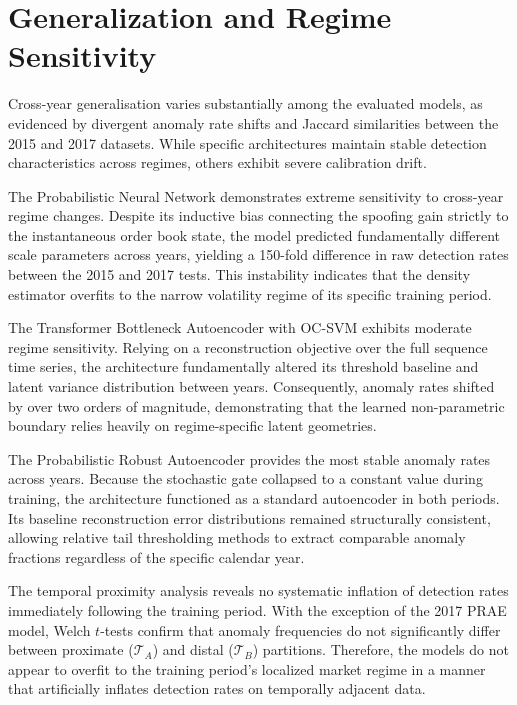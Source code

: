 \documentclass[11pt]{report}
\begin{document}
\section{Generalization and Regime Sensitivity}\label{sec:discussion:generalization}

Cross-year generalisation varies substantially among the evaluated models, as evidenced by divergent anomaly rate shifts and Jaccard similarities between the 2015 and 2017 datasets. While specific architectures maintain stable detection characteristics across regimes, others exhibit severe calibration drift.

The Probabilistic Neural Network demonstrates extreme sensitivity to cross-year regime changes. Despite its inductive bias connecting the spoofing gain strictly to the instantaneous order book state, the model predicted fundamentally different scale parameters across years, yielding a 150-fold difference in raw detection rates between the 2015 and 2017 tests. This instability indicates that the density estimator overfits to the narrow volatility regime of its specific training period.

The Transformer Bottleneck Autoencoder with OC-SVM exhibits moderate regime sensitivity. Relying on a reconstruction objective over the full sequence time series, the architecture fundamentally altered its threshold baseline and latent variance distribution between years. Consequently, anomaly rates shifted by over two orders of magnitude, demonstrating that the learned non-parametric boundary relies heavily on regime-specific latent geometries.

The Probabilistic Robust Autoencoder provides the most stable anomaly rates across years. Because the stochastic gate collapsed to a constant value during training, the architecture functioned as a standard autoencoder in both periods. Its baseline reconstruction error distributions remained structurally consistent, allowing relative tail thresholding methods to extract comparable anomaly fractions regardless of the specific calendar year.

The temporal proximity analysis reveals no systematic inflation of detection rates immediately following the training period. With the exception of the 2017 PRAE model, Welch $t$-tests confirm that anomaly frequencies do not significantly differ between proximate ($\mathcal{T}_A$) and distal ($\mathcal{T}_B$) partitions. Therefore, the models do not appear to overfit to the training period's localized market regime in a manner that artificially inflates detection rates on temporally adjacent data.
\end{document}
